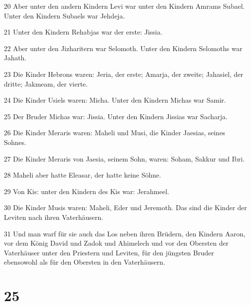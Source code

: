\par 20 Aber unter den andern Kindern Levi war unter den Kindern Amrams Subael. Unter den Kindern Subaels war Jehdeja.
\par 21 Unter den Kindern Rehabjas war der erste: Jissia.
\par 22 Aber unter den Jizharitern war Selomoth. Unter den Kindern Selomoths war Jahath.
\par 23 Die Kinder Hebrons waren: Jeria, der erste; Amarja, der zweite; Jahasiel, der dritte; Jakmeam, der vierte.
\par 24 Die Kinder Usiels waren: Micha. Unter den Kindern Michas war Samir.
\par 25 Der Bruder Michas war: Jissia. Unter den Kindern Jissias war Sacharja.
\par 26 Die Kinder Meraris waren: Maheli und Musi, die Kinder Jaesias, seines Sohnes.
\par 27 Die Kinder Meraris von Jaesia, seinem Sohn, waren: Soham, Sakkur und Ibri.
\par 28 Maheli aber hatte Eleasar, der hatte keine Söhne.
\par 29 Von Kis: unter den Kindern des Kis war: Jerahmeel.
\par 30 Die Kinder Musis waren: Maheli, Eder und Jeremoth. Das sind die Kinder der Leviten nach ihren Vaterhäusern.
\par 31 Und man warf für sie auch das Los neben ihren Brüdern, den Kindern Aaron, vor dem König David und Zadok und Ahimelech und vor den Obersten der Vaterhäuser unter den Priestern und Leviten, für den jüngsten Bruder ebensowohl als für den Obersten in den Vaterhäusern.

\chapter{25}

